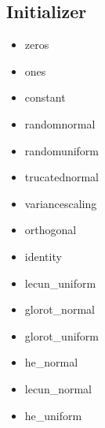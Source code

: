 %	
%	
%	
%	
%	
%	
%
%

\subsection{Initializer}
\begin{itemize}
	\item zeros
	\item ones
	\item constant
	\item randomnormal
	\item randomuniform
	\item trucatednormal
	\item variancescaling
	\item orthogonal
	\item identity
	\item lecun\_uniform
	\item glorot\_normal
	\item glorot\_uniform
	\item he\_normal
	\item lecun\_normal
	\item he\_uniform
\end{itemize}

